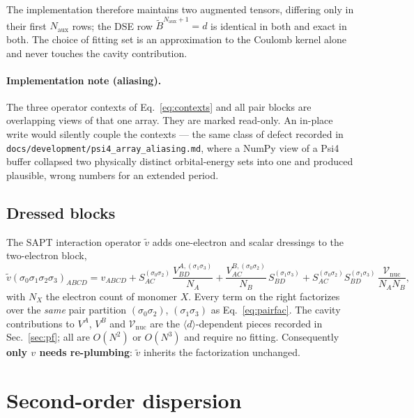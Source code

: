 \documentclass[11pt]{article}
\newcommand{\dexp}{\langle d \rangle}
\newcommand{\naux}{N_{\mathrm{aux}}}
\begin{document}
The implementation therefore maintains two augmented tensors, differing only in
their first $\naux$ rows; the DSE row $\tilde B^{\naux+1} = d$ is identical in
both and exact in both. The choice of fitting set is an approximation to the
Coulomb kernel alone and never touches the cavity contribution.

\paragraph{Implementation note (aliasing).} The three operator contexts of
Eq.~\eqref{eq:contexts} and all pair blocks are overlapping views of that one
array. They are marked read-only. An in-place write would silently couple the
contexts --- the same class of defect recorded in
\texttt{docs/development/psi4\_array\_aliasing.md}, where a NumPy view of a
Psi4 buffer collapsed two physically distinct orbital-energy sets into one and
produced plausible, wrong numbers for an extended period.

\subsection{Dressed blocks}

The SAPT interaction operator $\tilde{v}$ adds one-electron and scalar
dressings to the two-electron block,
\begin{equation}
\tilde{v}(\sigma_0\sigma_1\sigma_2\sigma_3)_{ABCD}
= v_{ABCD}
+ S^{(\sigma_0\sigma_2)}_{AC}\,\frac{V^{A,(\sigma_1\sigma_3)}_{BD}}{N_A}
+ \frac{V^{B,(\sigma_0\sigma_2)}_{AC}}{N_B}\,S^{(\sigma_1\sigma_3)}_{BD}
+ S^{(\sigma_0\sigma_2)}_{AC} S^{(\sigma_1\sigma_3)}_{BD}\,
  \frac{\mathcal{V}_{\mathrm{nuc}}}{N_A N_B},
\label{eq:vt}
\end{equation}
with $N_X$ the electron count of monomer $X$. Every term on the right
factorizes over the \emph{same} pair partition $(\sigma_0\sigma_2)$,
$(\sigma_1\sigma_3)$ as Eq.~\eqref{eq:pairfac}. The cavity contributions to
$V^A$, $V^B$ and $\mathcal{V}_{\mathrm{nuc}}$ are the $\dexp$-dependent pieces
recorded in Sec.~\ref{sec:pf}; all are $O(N^2)$ or $O(N^3)$ and require no
fitting. Consequently \textbf{only $v$ needs re-plumbing}: $\tilde v$ inherits
the factorization unchanged.

\section{Second-order dispersion}
\label{sec:disp}
\end{document}
